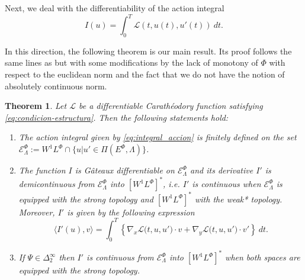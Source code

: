 \documentclass[twoside]{article}
\newtheorem{thm}{Theorem}[section]
\theoremstyle{remark}
\newcommand{\lphi}{L^{\Phi}}
\newcommand{\ephi}{E^{\Phi}}
\newcommand{\wphi}{W^{1}\lphi}
\newcommand{\domi}{\mathcal{E}^{\Phi}}
\begin{document}
Next, we deal with the differentiability of the action integral 
\begin{equation}\label{eq:integral_accion}
I(u)=\int_{0}^T \mathcal{L}(t,u(t),u'(t))\ dt.
\end{equation}

In this direction, the following theorem is our main result. Its proof follows the same lines as \cite[Th. 3.2]{ABGMS2015} but with some modifications by the lack of monotony of $\Phi$ with  respect to the euclidean norm and the fact that we do not have the notion of absolutely continuous norm.


\begin{thm}\label{teo:diferenciabilidad}
Let $\mathcal{L}$ be a differentiable Carath\'eodory function satisfying \eqref{eq:condicion-estructura}.
Then the following statements hold:
\begin{enumerate}
\item \label{it:T1item1} \label{A1} The action integral given by \eqref{eq:integral_accion}
is finitely defined on the set $\domi_{\Lambda}:=W^{1}\lphi\cap\{u|u'\in\Pi(\ephi,\Lambda)\}$.

\item\label{it:T1item3} The function  $I$ is G\^ateaux differentiable on $\domi_{\Lambda}$ and  its derivative $I'$ is demicontinuous from 
$\domi_{\Lambda}$  into $\left[\wphi \right]^*$, i.e. $I'$ is continuous when $\domi_{\Lambda}$ is equipped with the strong topology and   $\left[\wphi \right]^*$ with the weak* topology. Moreover, $I'$ is given by the following expression
\begin{equation}\label{eq:DerAccion}
\langle  I'(u),v\rangle= \int_0^T \left\{\nabla_x\mathcal{L}\big(t,u,u'\big)\cdot v
+ \nabla_y\mathcal{L}\big(t,u,u'\big)\cdot v'\right\} \ dt.
\end{equation}

\item\label{it:T1item4}  If  $\Psi \in \Delta^{\infty}_2$ then 
  $I'$ is continuous from $\domi_{\Lambda}$ into $\left[\wphi\right]^*$ when both spaces are equipped with the strong topology.
\end{enumerate}
\end{thm}
\end{document}
